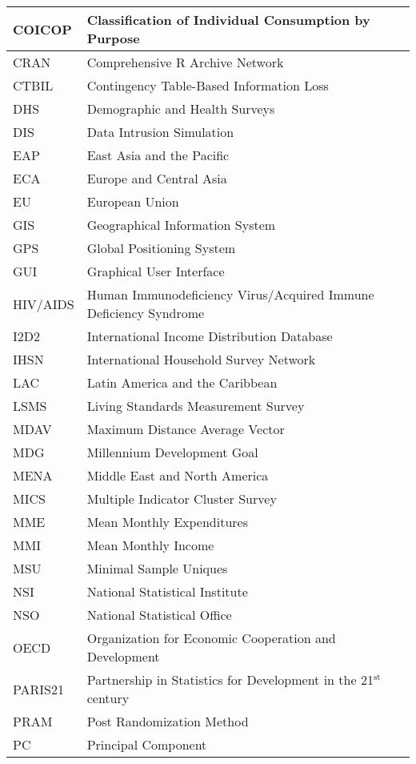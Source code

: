 \documentclass[letterpaper,10pt,english]{sphinxmanual}
\begin{document}
\begin{savenotes}
\begin{longtable}{|l|l|}
COICOP
&
Classification of Individual
Consumption by Purpose
\\
\hline
CRAN
&
Comprehensive R Archive Network
\\
\hline
CTBIL
&
Contingency Table-Based
Information Loss
\\
\hline
DHS
&
Demographic and Health Surveys
\\
\hline
DIS
&
Data Intrusion Simulation
\\
\hline
EAP
&
East Asia and the Pacific
\\
\hline
ECA
&
Europe and Central Asia
\\
\hline
EU
&
European Union
\\
\hline
GIS
&
Geographical Information System
\\
\hline
GPS
&
Global Positioning System
\\
\hline
GUI
&
Graphical User Interface
\\
\hline
HIV/AIDS
&
Human Immunodeficiency
Virus/Acquired Immune Deficiency
Syndrome
\\
\hline
I2D2
&
International Income Distribution
Database
\\
\hline
IHSN
&
International Household Survey
Network
\\
\hline
LAC
&
Latin America and the Caribbean
\\
\hline
LSMS
&
Living Standards Measurement
Survey
\\
\hline
MDAV
&
Maximum Distance Average Vector
\\
\hline
MDG
&
Millennium Development Goal
\\
\hline
MENA
&
Middle East and North America
\\
\hline
MICS
&
Multiple Indicator Cluster Survey
\\
\hline
MME
&
Mean Monthly Expenditures
\\
\hline
MMI
&
Mean Monthly Income
\\
\hline
MSU
&
Minimal Sample Uniques
\\
\hline
NSI
&
National Statistical Institute
\\
\hline
NSO
&
National Statistical Office
\\
\hline
OECD
&
Organization for Economic
Cooperation and Development
\\
\hline
PARIS21
&
Partnership in Statistics for
Development in the 21$^{\text{st}}$
century
\\
\hline
PRAM
&
Post Randomization Method
\\
\hline
PC
&
Principal Component
\\

\end{longtable}
\end{savenotes}
\end{document}
